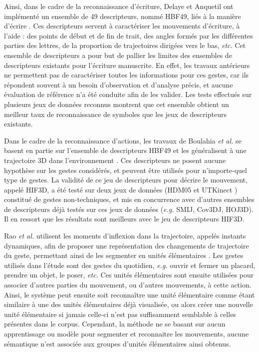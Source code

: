 Ainsi, dans le cadre de la reconnaissance d'écriture, Delaye et Anquetil ont implémenté un ensemble de 49 descripteurs, nommé HBF49, liés à la manière d'écrire \parencite{Delaye2013HBF}. Ces descripteurs servent à caractériser les mouvements d'écriture, à l'aide : des points de début et de fin de trait, des angles formés par les différentes parties des lettres, de la proportion de trajectoires dirigées vers le bas, \textit{etc.} Cet ensemble de descripteurs a pour but de pallier les limites des ensembles de descripteurs existants pour l'écriture manuscrite. En effet, les travaux antérieurs ne permettent pas de caractériser toutes les informations pour ces gestes, car ils répondent souvent à un besoin d'observation et d'analyse précis, et aucune évaluation de référence n'a été conduite afin de les valider. Les tests effectués sur plusieurs jeux de données reconnus montrent que cet ensemble obtient un meilleur taux de reconnaissance de symboles que les jeux de descripteurs existants.

Dans le cadre de la reconnaissance d'actions, les travaux de Boulahia \textit{et al.} se basent en partie sur l'ensemble de descripteurs HBF49 et les généralisent à une trajectoire 3D dans l'environnement \parencite{Boulahia2016HIF}. Ces descripteurs ne posent aucune hypothèse sur les gestes considérés, et peuvent être utilisés pour n'importe-quel type de gestes. La validité de ce jeu de descripteurs pour décrire le mouvement, appelé HIF3D, a été testé sur deux jeux de données (HDM05 \parencite{HDM05Database} et UTKinect \parencite{UTKinectDatabase}) constitué de gestes non-techniques, et mis en concurrence avec d'autres ensembles de descripteurs déjà testés sur ces jeux de données (\textit{e.g.} SMIJ, Cov3DJ, HOJ3D). Il en ressort que les résultats sont meilleurs avec le jeu de descripteurs HIF3D.

Rao \textit{et al.} utilisent les moments d'inflexion dans la trajectoire, appelés instants dynamiques, afin de proposer une représentation des changements de trajectoire du geste, permettant ainsi de les segmenter en unités élémentaires \parencite{Rao2002VRR}. Les gestes utilisés dans l'étude sont des gestes du quotidien, \textit{e.g.} ouvrir et fermer un placard, prendre un objet, le poser, \textit{etc.} Ces unités élémentaires sont ensuite utilisées pour associer d'autres parties du mouvement, ou d'autres mouvements, à cette action. Ainsi, le système peut ensuite soit reconnaître une unité élémentaire comme étant similaire à une des unités élémentaires déjà visualisée, ou alors créer une nouvelle unité élémentaire si jamais celle-ci n'est pas suffisamment semblable à celles présentes dans le corpus. Cependant, la méthode ne se basant sur aucun apprentissage ou modèle pour segmenter et reconnaitre les mouvements, aucune sémantique n'est associée aux groupes d'unités élémentaires ainsi obtenus.


